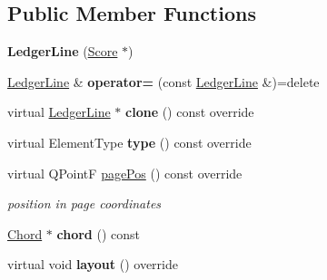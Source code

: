 \subsection*{Public Member Functions}
\begin{DoxyCompactItemize}
\item 
\mbox{\label{class_ms_1_1_ledger_line_a33f903e6a3459172cc54ddb3ee321c41}} 
{\bfseries Ledger\+Line} (\hyperlink{class_ms_1_1_score}{Score} $\ast$)
\item 
\mbox{\label{class_ms_1_1_ledger_line_a0b555e9993c433550b4add98c2bb9351}} 
\hyperlink{class_ms_1_1_ledger_line}{Ledger\+Line} \& {\bfseries operator=} (const \hyperlink{class_ms_1_1_ledger_line}{Ledger\+Line} \&)=delete
\item 
\mbox{\label{class_ms_1_1_ledger_line_a95bcfeda55e9e95867cf582ca5b78b6f}} 
virtual \hyperlink{class_ms_1_1_ledger_line}{Ledger\+Line} $\ast$ {\bfseries clone} () const override
\item 
\mbox{\label{class_ms_1_1_ledger_line_a292e61b9037da0494220907f26bd0f61}} 
virtual Element\+Type {\bfseries type} () const override
\item 
\mbox{\label{class_ms_1_1_ledger_line_a51586a5aac274a92a2eb3fff7e8fbb0e}} 
virtual Q\+PointF \hyperlink{class_ms_1_1_ledger_line_a51586a5aac274a92a2eb3fff7e8fbb0e}{page\+Pos} () const override
\begin{DoxyCompactList}\small\item\em position in page coordinates \end{DoxyCompactList}\item 
\mbox{\label{class_ms_1_1_ledger_line_a5d57fd935447b9cb60f4814eaa34ea4a}} 
\hyperlink{class_ms_1_1_chord}{Chord} $\ast$ {\bfseries chord} () const
\item 
\mbox{\label{class_ms_1_1_ledger_line_a185f3e1a81dedace6753770879c3882f}} 
virtual void {\bfseries layout} () override
\item 
\mbox{\label{class_ms_1_1_ledger_line_a207823217c3353884031ebf1203dbd35}} 

\end{DoxyCompactItemize}
